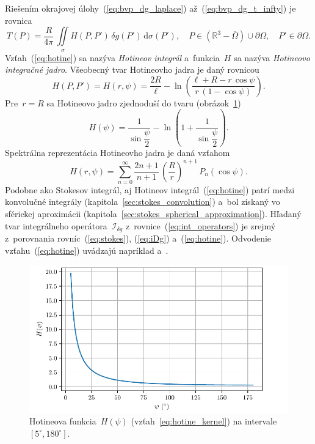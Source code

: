\documentclass[a4paper, 12pt]{book}
\newcommand{\diff}{\mathrm d}
\begin{document}
Riešením okrajovej úlohy~(\ref{eq:bvp_dg_laplace}) až~(\ref{eq:bvp_dg_t_infty}) 
je rovnica
%
\begin{equation}
\label{eq:hotine}
T(P) = \frac{R}{4\pi} \, \iint\limits_{\sigma} H(P, P') \, \delta g(P') \, 
\diff \sigma(P'){,} \quad P \in \left( \mathbb{R}^3 - \overline\Omega \right) 
\cup \partial\Omega{,} \quad P' \in \partial\Omega{.}
\end{equation}
%
Vzťah~(\ref{eq:hotine}) sa nazýva \emph{Hotineov integrál} a~funkcia~$H$ sa 
nazýva \emph{Hotineovo integračné jadro}.  Všeobecný tvar Hotineovho jadra je 
daný rovnicou \parencite{SansoGeoidDetermination}
%
\begin{equation}
\label{eq:hotine_kernel_general}
H(P, P') = H(r, \psi) = \frac{2R}{\ell} - \ln\left(\frac{\ell + R - r \, 
\cos\psi}{r \, (1 - \cos\psi)}\right){.}
\end{equation}
%
Pre~$r = R$ sa Hotineovo jadro zjednoduší do tvaru 
(obrázok~\ref{fig:hotine_kernel})
%
\begin{equation}
\label{eq:hotine_kernel}
H(\psi) = \frac{1}{\sin\dfrac{\psi}{2}} - \ln\left( 
1 + \frac{1}{\sin\dfrac{\psi}{2}} \right){.}
\end{equation}
%
Spektrálna reprezentácia Hotineovho jadra je daná vzťahom
%
\begin{equation}
\label{eq:hotine_spectral}
H(r, \psi) = \sum_{n = 0}^{\infty} \frac{2n + 1}{n + 1} \, \left( \frac{R}{r} 
\right)^{n + 1} \, P_n(\cos\psi){.}
\end{equation}
%
Podobne ako Stokesov integrál, aj Hotineov integrál~(\ref{eq:hotine}) patrí 
medzi konvolučné integrály (kapitola~\ref{sec:stokes_convolution}) a~bol 
získaný vo sférickej aproximácii 
(kapitola~\ref{sec:stokes_spherical_approximation}).  Hľadaný tvar integrálneho 
operátora~$\mathcal{I}_{\delta g}$ z~rovnice~(\ref{eq:int_operators}) je zrejmý 
z~porovnania rovníc~(\ref{eq:stokes}), (\ref{eq:iDg}) a~(\ref{eq:hotine}).  
Odvodenie vzťahu~(\ref{eq:hotine}) uvádzajú napríklad 
\textcite{MoritzPhysicalGeodesy} a~\textcite{SansoGeoidDetermination}.

\begin{figure}[bt]
\centering
\includegraphics{./fig-hotine-kernel.pdf}
\caption{Hotineova funkcia~$H(\psi)$ (vzťah~\ref{eq:hotine_kernel}) na 
intervale~$[5^\circ, 180^\circ]$.}
\label{fig:hotine_kernel}
\end{figure}
\end{document}
